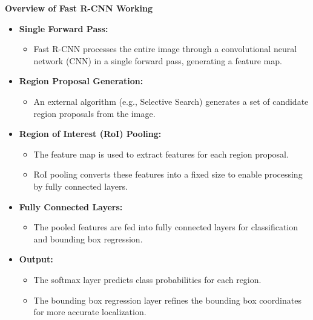 \documentclass{beamer}
\begin{document}
\begin{frame}{\textbf{Overview of Fast R-CNN Working}}
    \begin{itemize}
        \item \textbf{Single Forward Pass:}
        \begin{itemize}
            \item Fast R-CNN processes the entire image through a convolutional neural network (CNN) in a single forward pass, generating a feature map.
        \end{itemize}

        \item \textbf{Region Proposal Generation:}
        \begin{itemize}
            \item An external algorithm (e.g., Selective Search) generates a set of candidate region proposals from the image.
        \end{itemize}

        \item \textbf{Region of Interest (RoI) Pooling:}
        \begin{itemize}
            \item The feature map is used to extract features for each region proposal.
            \item RoI pooling converts these features into a fixed size to enable processing by fully connected layers.
        \end{itemize}

        \item \textbf{Fully Connected Layers:}
        \begin{itemize}
            \item The pooled features are fed into fully connected layers for classification and bounding box regression.
        \end{itemize}

        \item \textbf{Output:}
        \begin{itemize}
            \item The softmax layer predicts class probabilities for each region.
            \item The bounding box regression layer refines the bounding box coordinates for more accurate localization.
        \end{itemize}
    \end{itemize}
    \vfill
\end{frame}
\end{document}
